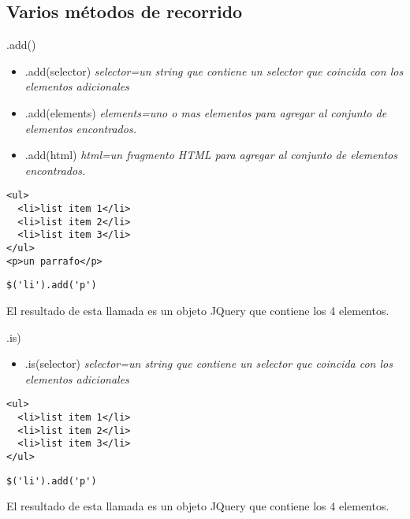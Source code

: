 \subsection{Varios métodos de recorrido} %

\begin{frame}[fragile]{.add()} %
\begin{itemize}
    \item .add(selector) \textit{ selector=un string que contiene un selector que coincida con los elementos adicionales}
    \item .add(elements) \textit{ elements=uno o mas elementos para agregar al
    conjunto de elementos encontrados.}
    \item .add(html) \textit{ html=un fragmento HTML para agregar al conjunto
    de elementos encontrados.}
\end{itemize}
\begin{lstlisting}
<ul>
  <li>list item 1</li>
  <li>list item 2</li>
  <li>list item 3</li>
</ul>
<p>un parrafo</p>
\end{lstlisting}
\begin{lstlisting}
$('li').add('p')
\end{lstlisting}
El resultado de esta llamada es un objeto JQuery que contiene los 4 elementos.
\end{frame}

\begin{frame}[fragile]{.is)} %
\begin{itemize}
    \item .is(selector) \textit{ selector=un string que contiene un selector que coincida con los elementos adicionales}
\end{itemize}
\begin{lstlisting}
<ul>
  <li>list item 1</li>
  <li>list item 2</li>
  <li>list item 3</li>
</ul>
\end{lstlisting}
\begin{lstlisting}
$('li').add('p')
\end{lstlisting}
El resultado de esta llamada es un objeto JQuery que contiene los 4 elementos.
\end{frame}


